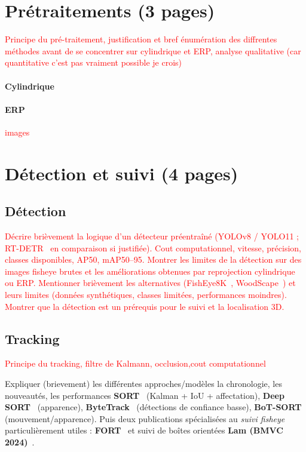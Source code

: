 \documentclass[11pt,a4paper]{article}
\begin{document}
\section{Prétraitements (3 pages)}

\textcolor{red}{Principe du pré-traitement, justification et bref énumération des diffrentes méthodes avant de se concentrer sur cylindrique et ERP, analyse qualitative (car quantitative c'est pas vraiment possible je crois)}

\paragraph{Cylindrique}

\paragraph{ERP}

\textcolor{red}{images}


\section{Détection et suivi (4 pages)}
\subsection*{Détection}

\textcolor{red}{Décrire brièvement la logique d'un détecteur préentraîné (YOLOv8 / YOLO11 ; RT-DETR~\cite{zhao2024} en comparaison si justifiée).
Cout computationnel, vitesse, précision, classes disponibles, AP50, mAP50--95. Montrer les limites de la détection sur des images fisheye brutes et les améliorations obtenues par reprojection cylindrique ou ERP. Mentionner brièvement les alternatives (FishEye8K~\cite{plauttutorial}, WoodScape~\cite{bourkefish2pano}) et leurs limites (données synthétiques, classes limitées, performances moindres). Montrer que la détection est un prérequis pour le suivi et la localisation 3D.}

\subsection*{Tracking}
\textcolor{red}{Principe du tracking, filtre de Kalmann, occlusion,cout computationnel}

Expliquer (brievement) les différentes approches/modèles la chronologie, les nouveautés, les performances \textbf{SORT}~\cite{bewley2016} (Kalman + IoU + affectation), \textbf{Deep SORT}~\cite{wojke2017} (apparence), \textbf{ByteTrack}~\cite{zhang2022bytetrack} (détections de confiance basse), \textbf{BoT-SORT}~\cite{aharon2022} (mouvement/apparence). Puis deux publications spécialisées au \emph{suivi fisheye} particulièrement utiles : \textbf{FORT}~\cite{odic2023fort} et suivi de boîtes orientées \textbf{Lam (BMVC 2024)}~\cite{lam2024}. 
\end{document}
